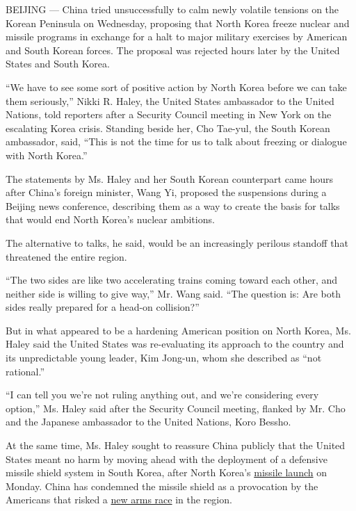 BEIJING --- China tried unsuccessfully to calm newly volatile tensions
on the Korean Peninsula on Wednesday, proposing that North Korea freeze
nuclear and missile programs in exchange for a halt to major military
exercises by American and South Korean forces. The proposal was rejected
hours later by the United States and South Korea.

``We have to see some sort of positive action by North Korea before we
can take them seriously,'' Nikki R. Haley, the United States ambassador
to the United Nations, told reporters after a Security Council meeting
in New York on the escalating Korea crisis. Standing beside her, Cho
Tae-yul, the South Korean ambassador, said, ``This is not the time for
us to talk about freezing or dialogue with North Korea.''

The statements by Ms. Haley and her South Korean counterpart came hours
after China's foreign minister, Wang Yi, proposed the suspensions during
a Beijing news conference, describing them as a way to create the basis
for talks that would end North Korea's nuclear ambitions.

The alternative to talks, he said, would be an increasingly perilous
standoff that threatened the entire region.

``The two sides are like two accelerating trains coming toward each
other, and neither side is willing to give way,'' Mr. Wang said. ``The
question is: Are both sides really prepared for a head-on collision?''

But in what appeared to be a hardening American position on North Korea,
Ms. Haley said the United States was re-evaluating its approach to the
country and its unpredictable young leader, Kim Jong-un, whom she
described as ``not rational.''

``I can tell you we're not ruling anything out, and we're considering
every option,'' Ms. Haley said after the Security Council meeting,
flanked by Mr. Cho and the Japanese ambassador to the United Nations,
Koro Bessho.

At the same time, Ms. Haley sought to reassure China publicly that the
United States meant no harm by moving ahead with the deployment of a
defensive missile shield system in South Korea, after North Korea's
\href{https://www.nytimes.com/2017/03/05/world/north-korea-ballistic-missiles.html?rref=collection\%2Fsectioncollection\%2Fasia\&action=click\&contentCollection=asia\&region=stream\&module=stream_unit\&version=latest\&contentPlacement=16\&pgtype=sectionfront}{missile
launch} on Monday. China has condemned the missile shield as a
provocation by the Americans that risked a
\href{https://www.nytimes.com/2017/03/07/world/asia/thaad-missile-defense-us-south-korea-china.html?rref=collection\%2Fsectioncollection\%2Fasia}{new
arms race} in the region.

